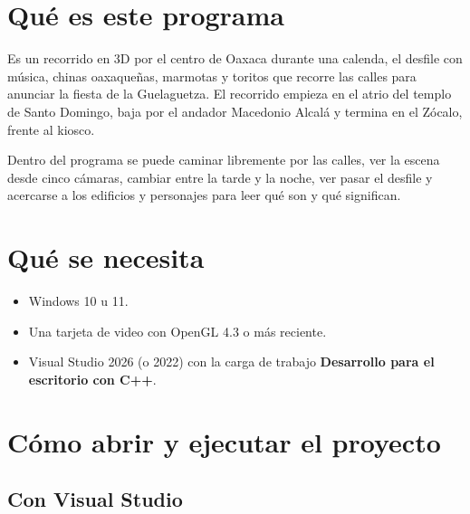 \documentclass[11pt,a4paper]{article}
\begin{document}

\tableofcontents
\clearpage

\section{Qué es este programa}

Es un recorrido en 3D por el centro de Oaxaca durante una calenda, el desfile con música, chinas oaxaqueñas, marmotas y toritos que recorre las calles para anunciar la fiesta de la Guelaguetza.
El recorrido empieza en el atrio del templo de Santo Domingo, baja por el andador Macedonio Alcalá y termina en el Zócalo, frente al kiosco.

Dentro del programa se puede caminar libremente por las calles, ver la escena desde cinco cámaras, cambiar entre la tarde y la noche, ver pasar el desfile y acercarse a los edificios y personajes para leer qué son y qué significan.


\section{Qué se necesita}

\begin{itemize}
  \item Windows 10 u 11.
  \item Una tarjeta de video con OpenGL 4.3 o más reciente.
  \item Visual Studio 2026 (o 2022) con la carga de trabajo \textbf{Desarrollo para el escritorio con C++}.
\end{itemize}

\clearpage
\section{Cómo abrir y ejecutar el proyecto}

\subsection{Con Visual Studio}
\end{document}
